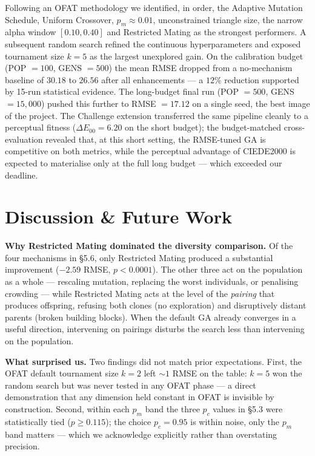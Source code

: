 \documentclass[11pt,a4paper]{article}
\begin{document}
Following an OFAT methodology we identified, in order, the Adaptive
Mutation Schedule, Uniform Crossover, $p_m \approx 0.01$,
unconstrained triangle size, the narrow alpha window $[0.10, 0.40]$
and Restricted Mating as the strongest performers. A subsequent random
search refined the continuous hyperparameters and exposed tournament
size $k = 5$ as the largest unexplored gain. On the calibration budget
(POP $= 100$, GENS $= 500$) the mean RMSE dropped from a no-mechanism
baseline of $30.18$ to $26.56$ after all enhancements --- a $12\%$
reduction supported by 15-run statistical evidence. The long-budget
final run (POP $= 500$, GENS $= 15{,}000$) pushed this further to
RMSE $= 17.12$ on a single seed, the best image of the project. The
Challenge extension transferred the same pipeline cleanly to a
perceptual fitness ($\Delta E_{00} = 6.20$ on the short budget); the
budget-matched cross-evaluation revealed that, at this short setting,
the RMSE-tuned GA is competitive on both metrics, while the perceptual
advantage of CIEDE2000 is expected to materialise only at the full
long budget --- which exceeded our deadline.

\section{Discussion \& Future Work}

\textbf{Why Restricted Mating dominated the diversity comparison.}
Of the four mechanisms in \S5.6, only Restricted Mating produced a
substantial improvement ($-2.59$ RMSE, $p < 0.0001$). The other
three act on the population as a whole --- rescaling mutation,
replacing the worst individuals, or penalising crowding --- while
Restricted Mating acts at the level of the \emph{pairing} that
produces offspring, refusing both clones (no exploration) and
disruptively distant parents (broken building blocks). When the
default GA already converges in a useful direction, intervening on
pairings disturbs the search less than intervening on the population.

\textbf{What surprised us.} Two findings did not match prior
expectations. First, the OFAT default tournament size $k=2$ left
$\sim 1$ RMSE on the table: $k=5$ won the random search but was
never tested in any OFAT phase --- a direct demonstration that any
dimension held constant in OFAT is invisible by construction.
Second, within each $p_m$ band the three $p_c$ values in \S5.3
were statistically tied ($p \geq 0.115$); the choice $p_c = 0.95$
is within noise, only the $p_m$ band matters --- which we
acknowledge explicitly rather than overstating precision.
\end{document}
